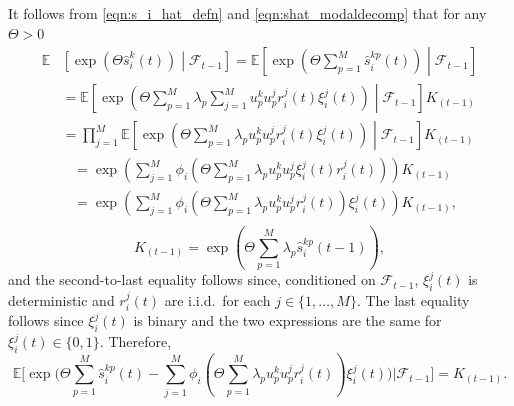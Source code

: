\documentclass[final,5p,times,twocolumn]{elsarticle}
\theoremstyle{definition}
\def \mc {\mathcal}
\newcommand{\until}[1]{\{1,\dots, #1\}}
\newcommand{\expp}[1]{%
	\exp \! \left(#1\right)%
}
\begin{document}
	It follows from \eqref{eqn:s_i_hat_defn} and \eqref{eqn:shat_modaldecomp} that for any $\Theta > 0$
	\begin{align*}
		\mathbb{E}& \left[\expp{\Theta \hat{s}_i^k(t)} \middle \vert \mc F_{t-1} \right] =
		\mathbb{E}\left[\expp{\Theta \sum_{p=1}^M \hat{s}_i^{kp}(t)} \middle \vert \mc F_{t-1} \right] 	
		\\
		& = \mathbb{E} \left[ \expp{\Theta \sum_{p=1}^M \lambda_p \sum_{j=1}^M u_p^k u_p^j r_i^j(t) \xi_i^j(t)}  \middle \vert \mc F_{t-1} \right] K_{(t-1)} \\
		& = \prod_{j=1}^M \mathbb{E} \left[ \expp{\Theta \sum_{p=1}^M \lambda_p  u_p^k u_p^j r_i^j(t) \xi_i^j(t)}  \middle \vert \mc F_{t-1} \right] K_{(t-1)} 
				\end{align*}
		\begin{align*}
		& = \expp{\sum_{j=1}^M \phi_i \left( \Theta \sum_{p=1}^M \lambda_p u_p^k u_p^j \xi_i^j(t) r_i^j(t)  \right)  } K_{(t-1)} \\
		& = \expp{\sum_{j=1}^M \phi_i \left( \Theta \sum_{p=1}^M \lambda_p u_p^k u_p^j r_i^j(t)  \right) \xi_i^j(t) } {K_{(t-1)},}\\
	\end{align*}
	\[
	{K_{(t-1)} = \expp{\Theta \sum_{p=1}^M \lambda_p \hat{s}_i^{kp}(t-1)},}
	\]
	and the second-to-last equality follows since,
	conditioned on $\mc F_{t-1}$, $ \xi_i^j(t)$ is %
	deterministic %
	and $r_i^j(t)$ are i.i.d.~for each $j \in \until{M}$.  The last equality follows since $\xi_i^j(t)$ is binary and the two expressions are the same for $\xi_i^j(t)\in \{0,1\}$. Therefore, %
\[
		\mathbb{E} \Bigg[ \! \exp \bigg(\Theta \!\! \sum_{p=1}^M \hat{s}_i^{kp}(t) - \! \sum_{j=1}^M \phi_i \left( \Theta \!\! \sum_{p=1}^M \! \lambda_p u_p^k u_p^j r_i^j(t)  \right) %
		\xi_i^j(t)\bigg)
			\bigg| \mc F_{t-1} \! \Bigg] \! = \! {K_{(t-1)}.}
			\]
\end{document}
